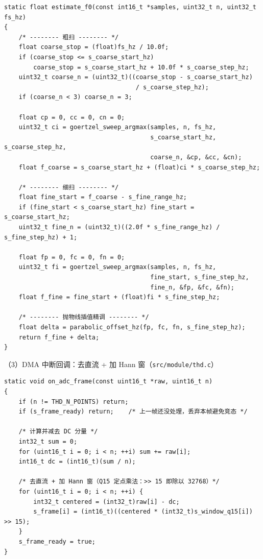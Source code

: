 \documentclass[a4paper]{article}
\begin{document}
	\begin{lstlisting}[caption={estimate\_f0：粗扫→细扫→抛物线插值，最终精度约 $\pm 10$\,Hz}]
static float estimate_f0(const int16_t *samples, uint32_t n, uint32_t fs_hz)
{
    /* -------- 粗扫 -------- */
    float coarse_stop = (float)fs_hz / 10.0f;
    if (coarse_stop <= s_coarse_start_hz)
        coarse_stop = s_coarse_start_hz + 10.0f * s_coarse_step_hz;
    uint32_t coarse_n = (uint32_t)((coarse_stop - s_coarse_start_hz)
                                    / s_coarse_step_hz);
    if (coarse_n < 3) coarse_n = 3;

    float cp = 0, cc = 0, cn = 0;
    uint32_t ci = goertzel_sweep_argmax(samples, n, fs_hz,
                                        s_coarse_start_hz, s_coarse_step_hz,
                                        coarse_n, &cp, &cc, &cn);
    float f_coarse = s_coarse_start_hz + (float)ci * s_coarse_step_hz;

    /* -------- 细扫 -------- */
    float fine_start = f_coarse - s_fine_range_hz;
    if (fine_start < s_coarse_start_hz) fine_start = s_coarse_start_hz;
    uint32_t fine_n = (uint32_t)((2.0f * s_fine_range_hz) / s_fine_step_hz) + 1;

    float fp = 0, fc = 0, fn = 0;
    uint32_t fi = goertzel_sweep_argmax(samples, n, fs_hz,
                                        fine_start, s_fine_step_hz,
                                        fine_n, &fp, &fc, &fn);
    float f_fine = fine_start + (float)fi * s_fine_step_hz;

    /* -------- 抛物线插值精调 -------- */
    float delta = parabolic_offset_hz(fp, fc, fn, s_fine_step_hz);
    return f_fine + delta;
}
	\end{lstlisting}

	（3）DMA 中断回调：去直流 + 加 Hann 窗（\texttt{src/module/thd.c}）

	\begin{lstlisting}[caption={ISR 中的核心预处理：均值去 DC、Q15 定点乘 Hann 窗、写入工作帧}]
static void on_adc_frame(const uint16_t *raw, uint16_t n)
{
    if (n != THD_N_POINTS) return;
    if (s_frame_ready) return;    /* 上一帧还没处理，丢弃本帧避免竞态 */

    /* 计算并减去 DC 分量 */
    int32_t sum = 0;
    for (uint16_t i = 0; i < n; ++i) sum += raw[i];
    int16_t dc = (int16_t)(sum / n);

    /* 去直流 + 加 Hann 窗（Q15 定点乘法：>> 15 即除以 32768）*/
    for (uint16_t i = 0; i < n; ++i) {
        int32_t centered = (int32_t)raw[i] - dc;
        s_frame[i] = (int16_t)((centered * (int32_t)s_window_q15[i]) >> 15);
    }
    s_frame_ready = true;
}
	\end{lstlisting}
\end{document}
